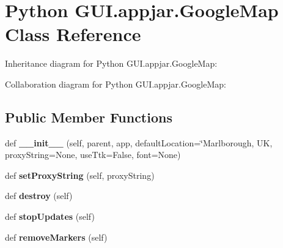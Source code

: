 \hypertarget{class_python_01_g_u_i_1_1appjar_1_1_google_map}{}\section{Python G\+U\+I.\+appjar.\+Google\+Map Class Reference}
\label{class_python_01_g_u_i_1_1appjar_1_1_google_map}


Inheritance diagram for Python G\+U\+I.\+appjar.\+Google\+Map\+:


Collaboration diagram for Python G\+U\+I.\+appjar.\+Google\+Map\+:
\subsection*{Public Member Functions}
\begin{DoxyCompactItemize}
\item 
\mbox{\label{class_python_01_g_u_i_1_1appjar_1_1_google_map_afad1f40349e34c2286c8841df72bf6df}} 
def {\bfseries \+\_\+\+\_\+init\+\_\+\+\_\+} (self, parent, app, default\+Location=\char`\"{}Marlborough,  UK,  proxy\+String=None,  use\+Ttk=False,  font=None)
\item 
\mbox{\label{class_python_01_g_u_i_1_1appjar_1_1_google_map_a3a37a7de0d904302daacb011a07a776a}} 
def {\bfseries set\+Proxy\+String} (self, proxy\+String)
\item 
\mbox{\label{class_python_01_g_u_i_1_1appjar_1_1_google_map_aacaa215df45d880078e16ad810cd3787}} 
def {\bfseries destroy} (self)
\item 
\mbox{\label{class_python_01_g_u_i_1_1appjar_1_1_google_map_a62f1f03d457203a984d17267856a90da}} 
def {\bfseries stop\+Updates} (self)
\item 
\mbox{\label{class_python_01_g_u_i_1_1appjar_1_1_google_map_af02b1cc4a9b54e16918f576670f58c8e}} 
def {\bfseries remove\+Markers} (self)
\item 
\mbox{\label{class_python_01_g_u_i_1_1appjar_1_1_google_map_ab9caaca99591d469795fbc82cddafb23}} 

\end{DoxyCompactItemize}
